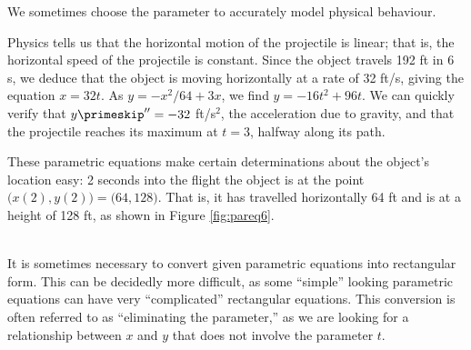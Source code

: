 We sometimes choose the parameter to accurately model physical behaviour.\\

{Physics tells us that the horizontal motion of the projectile is linear; that is, the horizontal speed of the projectile is constant. Since the object travels 192 ft in 6 s, we deduce that the object is moving horizontally at a rate of 32 ft/s, giving the equation $x=32t$. As $y=-x^2/64+3x$, we find $y= -16t^2+96t$. We can quickly verify that $y\primeskip''=-32$ ft/s$^2$, the acceleration due to gravity, and that the projectile reaches its maximum at $t=3$, halfway along its path.

These parametric equations make certain determinations about the object's location easy: 2 seconds into the flight the object is at the point $\big(x(2),y(2)\big) = \big(64,128\big)$. That is, it has travelled horizontally 64 ft and is at a height of 128 ft, as shown in Figure \ref{fig:pareq6}.
}\\

It is  sometimes necessary to convert given parametric equations into rectangular form. This can be decidedly more difficult, as some ``simple'' looking parametric equations can have very ``complicated'' rectangular equations. This conversion is often referred to as ``eliminating the parameter,'' as we are looking for a relationship between $x$ and $y$ that does not involve the parameter $t$.\\

